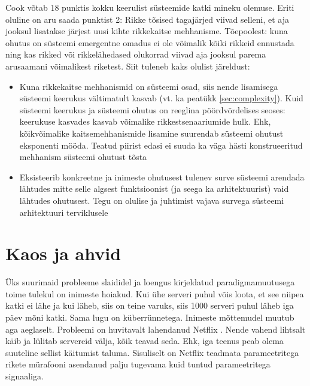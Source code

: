 \documentclass{tufte-book}
\begin{document}
Cook \citep{cook1998complex} võtab 18 punktis kokku keerulist süsteemide katki mineku olemuse. Eriti oluline on aru saada punktist 2: Rikke tõsised tagajärjed viivad selleni, et aja jooksul lisatakse järjest uusi kihte rikkekaitse mehhanisme. Tõepoolest: kuna ohutus on süsteemi emergentne omadus ei ole võimalik kõiki rikkeid ennustada ning kas rikked või rikkelähedased olukorrad viivad aja jooksul parema arusaamani võimalikest riketest. Siit tuleneb kaks olulist järeldust:
\begin{itemize}
	\item Kuna rikkekaitse mehhanismid on süsteemi osad, siis nende lisamisega süsteemi keerukus vältimatult kasvab (vt. ka peatükk \ref{sec:complexity}). Kuid süsteemi keerukus ja süsteemi ohutus on reeglina pöördvõrdelises seoses: keerukuse kasvades kasvab võimalike rikkestsenaariumide hulk. Ehk, kõikvõimalike kaitsemehhanismide lisamine suurendab süsteemi ohutust eksponenti mööda. Teatud piirist edasi ei suuda ka väga hästi konstrueeritud mehhanism süsteemi ohutust tõsta
	\item Eksisteerib konkreetne ja inimeste ohutusest tulenev surve süsteemi arendada lähtudes mitte selle algsest funktsioonist (ja seega ka arhitektuurist) vaid lähtudes ohutusest. Tegu on olulise ja juhtimist vajava survega süsteemi arhitektuuri terviklusele
\end{itemize} 

\section{Kaos ja ahvid}
Üks suurimaid probleeme slaididel ja loengus kirjeldatud paradigmamuutusega toime tulekul on inimeste hoiakud. Kui ühe serveri puhul võis loota, et see niipea katki ei lähe ja kui läheb, siis on teine varuks, siis 1000 serveri puhul läheb iga päev mõni katki. Sama lugu on küberrünnetega. Inimeste mõttemudel muutub aga aeglaselt. Probleemi on huvitavalt lahendanud Netflix \cite{monkey}. Nende vahend lihtsalt käib ja lülitab servereid välja, kõik teavad seda. Ehk, iga teenus peab olema suuteline sellist käitumist taluma. Sisuliselt on Netflix teadmata parameetritega rikete mürafooni asendanud palju tugevama kuid tuntud parameetritega signaaliga.   

\end{document}
